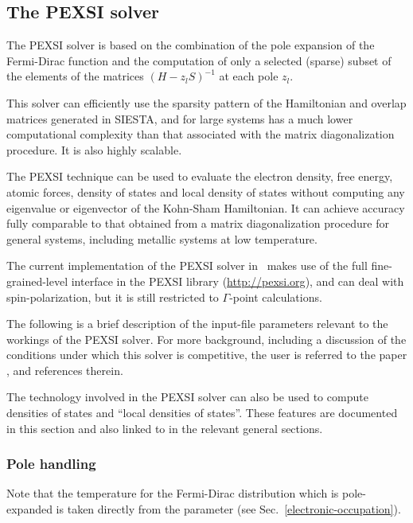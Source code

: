 \subsection{The PEXSI solver}
\label{SolverPEXSI}

The PEXSI solver is based on the combination of the pole expansion of
the Fermi-Dirac function and the computation of only a selected
(sparse) subset of the elements of the matrices $(H-z_lS)^{-1}$ at
each pole $z_l$.

This solver can efficiently use the sparsity pattern of
the Hamiltonian and overlap matrices generated in SIESTA, and for
large systems has a much lower computational complexity than that
associated with the matrix diagonalization procedure. It is also
highly scalable.

The PEXSI technique can be used to evaluate the electron density, free
energy, atomic forces, density of states and local density of states
without computing any eigenvalue or eigenvector of the Kohn-Sham
Hamiltonian. It can achieve accuracy fully comparable to that obtained
from a matrix diagonalization procedure for general systems, including
metallic systems at low temperature.  

The current implementation of the PEXSI solver in \siesta\ makes
use of the full fine-grained-level interface in the PEXSI library
(\url{http://pexsi.org}), and can deal with spin-polarization, but it
is still restricted to $\Gamma$-point calculations. 

The following is a brief description of the input-file parameters
relevant to the workings of the PEXSI solver. For more background,
including a discussion of the conditions under which this solver is
competitive, the user is referred to the paper \cite{Lin2014}, and
references therein.

The technology involved in the PEXSI solver can also be used
to compute densities of states and ``local densities of
states''. These features are documented in this section and also
linked to in the relevant general sections.

\subsubsection{Pole handling}

Note that the temperature for the Fermi-Dirac distribution which is
pole-expanded is taken directly from the 
parameter (see Sec.~\ref{electronic-occupation}).

